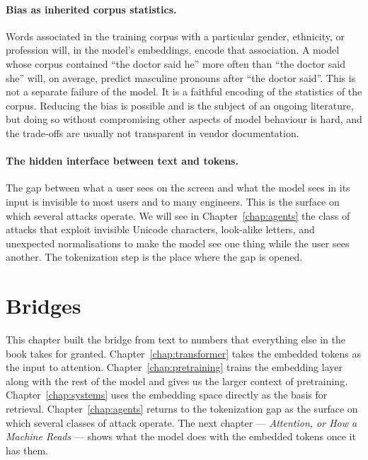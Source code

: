 \paragraph{Bias as inherited corpus statistics.} Words associated
in the training corpus with a particular gender, ethnicity, or
profession will, in the model's embeddings, encode that
association. A model whose corpus contained ``the doctor said
he'' more often than ``the doctor said she'' will, on average,
predict masculine pronouns after ``the doctor said''. This is
not a separate failure of the model. It is a faithful encoding
of the statistics of the corpus. Reducing the bias is possible
and is the subject of an ongoing literature, but doing so
without compromising other aspects of model behaviour is hard,
and the trade-offs are usually not transparent in vendor
documentation.

\paragraph{The hidden interface between text and tokens.} The
gap between what a user sees on the screen and what the model
sees in its input is invisible to most users and to many
engineers. This is the surface on which several attacks
operate. We will see in Chapter~\ref{chap:agents} the class of attacks that
exploit invisible Unicode characters, look-alike letters, and
unexpected normalisations to make the model see one thing while
the user sees another. The tokenization step is the place where
the gap is opened.

\section*{Bridges}

This chapter built the bridge from text to numbers that
everything else in the book takes for granted. Chapter~\ref{chap:transformer} takes
the embedded tokens as the input to attention. Chapter~\ref{chap:pretraining}
trains the embedding layer along with the rest of the model and
gives us the larger context of pretraining. Chapter~\ref{chap:systems} uses the
embedding space directly as the basis for retrieval. Chapter~\ref{chap:agents}
returns to the tokenization gap as the surface on which several
classes of attack operate. The next chapter --- \emph{Attention,
or How a Machine Reads} --- shows what the model does with the
embedded tokens once it has them.

